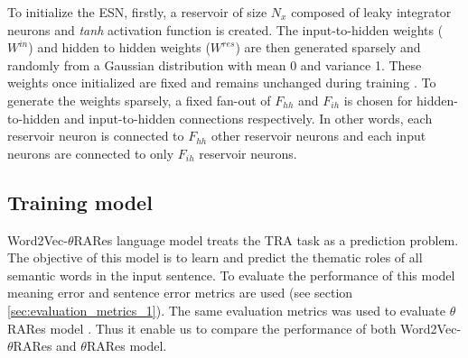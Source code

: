 To initialize the ESN, firstly, a reservoir of size $N_{x}$ composed of leaky integrator neurons and \textit{tanh} activation function is created. The input-to-hidden weights ($W^{in}$) and hidden to hidden weights ($W^{res}$) are then generated sparsely and randomly from a Gaussian distribution with mean 0 and variance 1. These weights once initialized are fixed and remains unchanged during training \cite{esn:scholarpedia:2007, esn:practical_guide}. To generate the weights sparsely, a fixed fan-out of $F_{hh}$ and $F_{ih}$ is chosen for hidden-to-hidden and input-to-hidden connections respectively. In other words, each reservoir neuron is connected to $F_{hh}$ other reservoir neurons and each input neurons are connected to only $F_{ih}$ reservoir neurons. 

\subsection{Training model}

Word2Vec-$\theta$RARes language model treats the TRA task as a prediction problem. The objective of this model is to learn and predict the thematic roles of all semantic words in the input sentence. To evaluate the performance of this model meaning error and sentence error metrics are used (see section \ref{sec:evaluation_metrics_1}). The same evaluation metrics was used to evaluate $\theta$RARes model \cite{xavier:2013:RT}. Thus it enable us to compare the performance of both Word2Vec-$\theta$RARes and $\theta$RARes model.



